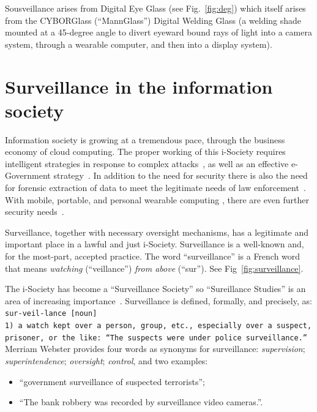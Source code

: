 Sousveillance arises from Digital Eye Glass (see Fig.~\ref{fig:deg})
which itself arises from the CYBORGlass (``MannGlass'') Digital Welding
Glass (a welding shade mounted at a 45-degree angle to divert eyeward
bound rays of light into a camera system, through a wearable computer,
and then into a display system).

\section{Surveillance in the information society}
Information society is growing at a tremendous pace, through
the business economy of cloud computing.
The proper working of this i-Society requires intelligent strategies in response to complex attacks~\cite{hooper2007intelligent}, as well as an effective e-Government strategy~\cite{edwards2011government}.
In addition to the need for security there is also the need
for forensic extraction of data to meet the legitimate needs of law enforcement~\cite{olajide2011forensic}.
With mobile, portable, and personal wearable computing \cite{mann2001wearable},
there are even further security needs~\cite{fischer2012survey}.

Surveillance, together with necessary oversight mechanisms, has a
legitimate and important place in a lawful and just i-Society.
Surveillance is a well-known and, for the most-part, accepted practice.
The word ``surveillance'' is a French word that means
{\em watching} (``veillance'') {\em from above} (``sur'').
See Fig~\ref{fig:surveillance}.

The i-Society has become a ``Surveillance Society'' so
``Sureillance Studies'' is an area of increasing
importance~\cite{lyon2001surveillance}.
Surveillance is defined, formally, and precisely, as:\\
\noindent
{\tt sur-veil-lance [noun]\\
1) a watch kept over a person, group, etc., especially over a suspect,
   prisoner, or the like:
   ``The suspects were under police surveillance.''}\cite{dictionary.com}\\
Merriam Webster provides four words as synonyms for surveillance:
{\em supervision}; {\em superintendence}; {\em oversight};
{\em control}, and two
examples:
\begin{itemize}
\vspace{-.05in}
 \item ``government surveillance of suspected terrorists'';
 \item ``The bank robbery was recorded by surveillance video cameras.''.
\end{itemize}


